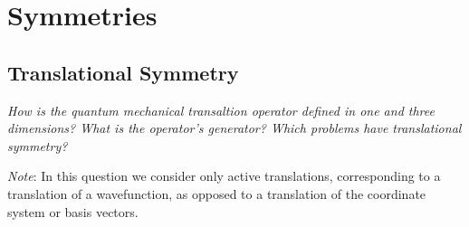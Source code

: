 \documentclass[11pt, a4paper]{article}
\begin{document}
\newpage
\section{Symmetries}

\subsection{Translational Symmetry}
\textit{How is the quantum mechanical transaltion operator defined in one and three dimensions? What is the operator's generator? Which problems have translational symmetry?}


\vspace{2mm}
\textit{Note}: In this question we consider only active translations, corresponding to a translation of a wavefunction, as opposed to a translation of the coordinate system or basis vectors. 
\end{document}
